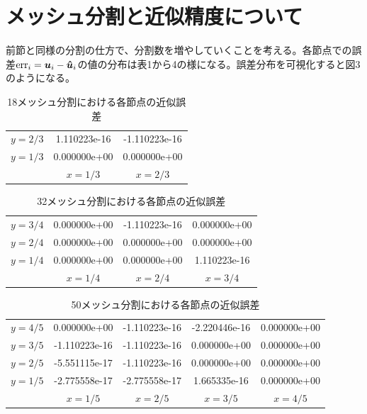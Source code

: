 \documentclass[a4paper,11pt]{jsarticle}
\begin{document}
\section{メッシュ分割と近似精度について}
前節と同様の分割の仕方で、分割数を増やしていくことを考える。各節点での誤差\(\mathrm{err}_i=\vb*{u}_i-\vb*{\hat{u}}_i\)の値の分布は表1から4の様になる。誤差分布を可視化すると図3のようになる。

\begin{table}
  \begin{center}
    \label{18m}
    \caption{18メッシュ分割における各節点の近似誤差}
    \begin{tabular}{ccc}
   \(y=2/3\) & 1.110223e-16 &-1.110223e-16 \\
   \(y=1/3\) & 0.000000e+00 & 0.000000e+00 \\
             & \(x=1/3\) & \(x=2/3\) 
    \end{tabular}
  \end{center}
\end{table}

\begin{table}
  \begin{center}
    \label{32m}
    \caption{32メッシュ分割における各節点の近似誤差}
    \begin{tabular}{cccc}
   \(y=3/4\) & 0.000000e+00 & -1.110223e-16 & 0.000000e+00 \\
   \(y=2/4\) & 0.000000e+00 & 0.000000e+00 & 0.000000e+00 \\
   \(y=1/4\) & 0.000000e+00 & 0.000000e+00 & 1.110223e-16 \\
             & \(x=1/4\) & \(x=2/4\) & \(x=3/4\) 
    \end{tabular}
  \end{center}
\end{table}

\begin{table}
  \begin{center}
    \label{50m}
    \caption{50メッシュ分割における各節点の近似誤差}
    \begin{tabular}{ccccc}
   \(y=4/5\) & 0.000000e+00 & -1.110223e-16 & -2.220446e-16 & 0.000000e+00 \\
   \(y=3/5\) &  -1.110223e-16 & -1.110223e-16 & 0.000000e+00 & 0.000000e+00 \\
   \(y=2/5\) &  -5.551115e-17 & -1.110223e-16 & 0.000000e+00 & 0.000000e+00\\
   \(y=1/5\) & -2.775558e-17 & -2.775558e-17 & 1.665335e-16 & 0.000000e+00  \\
             & \(x=1/5\) & \(x=2/5\) & \(x=3/5\) & \(x=4/5\) 
    \end{tabular}
  \end{center}
\end{table}
\end{document}
